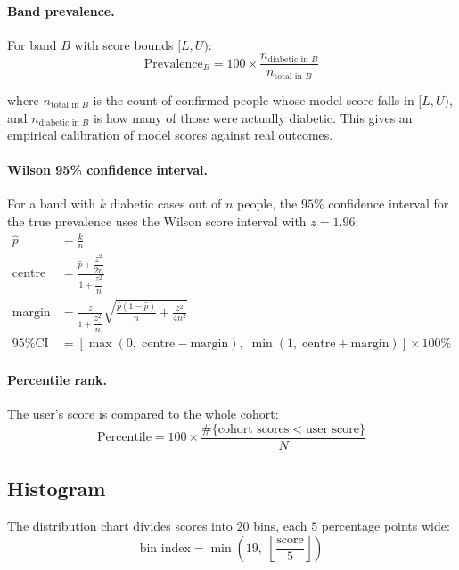\paragraph{Band prevalence.}
For band $B$ with score bounds $[L, U)$:
\begin{equation}
    \text{Prevalence}_B = 100 \times \frac{n_{\text{diabetic in }B}}{n_{\text{total in }B}}
    \label{eq:band-prevalence}
\end{equation}

where $n_{\text{total in }B}$ is the count of confirmed people whose model score falls in $[L, U)$, and $n_{\text{diabetic in }B}$ is how many of those were actually diabetic. This gives an empirical calibration of model scores against real outcomes.

\paragraph{Wilson 95\% confidence interval.}
For a band with $k$ diabetic cases out of $n$ people, the $95\%$ confidence interval for the true prevalence uses the Wilson score interval with $z = 1.96$:
\begin{align}
    \hat{p} &= \frac{k}{n} \\
    \text{centre} &= \frac{\hat{p} + \dfrac{z^2}{2n}}{1 + \dfrac{z^2}{n}} \\
    \text{margin} &= \frac{z}{1 + \dfrac{z^2}{n}} \sqrt{\frac{\hat{p}(1-\hat{p})}{n} + \frac{z^2}{4n^2}} \\
    \text{95\% CI} &= \left[ \max\!\left(0,\; \text{centre} - \text{margin}\right),\; \min\!\left(1,\; \text{centre} + \text{margin}\right) \right] \times 100\%
\end{align}

\paragraph{Percentile rank.}
The user's score is compared to the whole cohort:
\begin{equation}
    \text{Percentile} = 100 \times \frac{\#\{\text{cohort scores} < \text{user score}\}}{N}
    \label{eq:percentile}
\end{equation}

\subsection{Histogram}

The distribution chart divides scores into $20$ bins, each $5$ percentage points wide:
\begin{equation}
    \text{bin index} = \min\!\left(19,\; \left\lfloor \frac{\text{score}}{5} \right\rfloor \right)
\end{equation}


